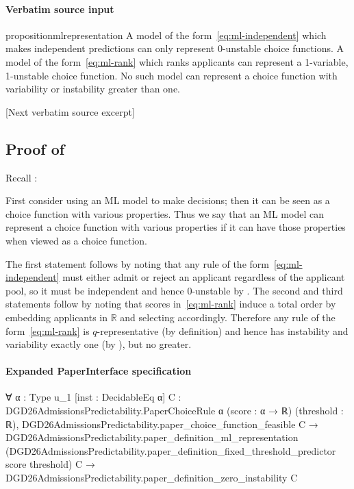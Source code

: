 \documentclass[10pt]{article}
\begin{document}
\paragraph{Verbatim source input}
\begin{ReviewVerbatim}
\begin{restatable}[ML Representation]{proposition}{mlrepresentation}
\label{prop:ml-representation}
A model of the form~\eqref{eq:ml-independent} which makes independent predictions can only represent 0-unstable choice functions.
A model of the form~\eqref{eq:ml-rank} which ranks applicants can represent a 1-variable, 1-unstable choice function. No such model can represent a choice function with variability or instability greater than one.
\end{restatable}

[Next verbatim source excerpt]

\subsection{Proof of } \label{sec:ml-prop-proof}

Recall :
\mlrepresentation*

First consider using an ML model to make decisions; then it can be seen as a choice function with various properties.
Thus we say that an ML model can represent a choice function with various properties if it can have those properties when viewed as a choice function. %

The first statement follows by noting that any rule of the form~\eqref{eq:ml-independent} must either admit or reject an applicant regardless of the applicant pool, so it must be independent and hence $0$-unstable by . %
The second and third statements follow by noting that scores in~\eqref{eq:ml-rank} induce a total order by embedding applicants in $\mathbb R$ and selecting accordingly. Therefore any rule of the form~\eqref{eq:ml-rank} is $q$-representative (by definition) and hence has instability and variability exactly one (by ), but no greater.
\end{ReviewVerbatim}


\paragraph{Expanded PaperInterface specification}
\begin{ReviewVerbatim}
∀ {α : Type u_1} [inst : DecidableEq α] {C : DGD26AdmissionsPredictability.PaperChoiceRule α} (score : α → ℝ)
  (threshold : ℝ),
  DGD26AdmissionsPredictability.paper_choice_function_feasible C →
    DGD26AdmissionsPredictability.paper_definition_ml_representation
        (DGD26AdmissionsPredictability.paper_definition_fixed_threshold_predictor score threshold) C →
      DGD26AdmissionsPredictability.paper_definition_zero_instability C
\end{ReviewVerbatim}
\end{document}
